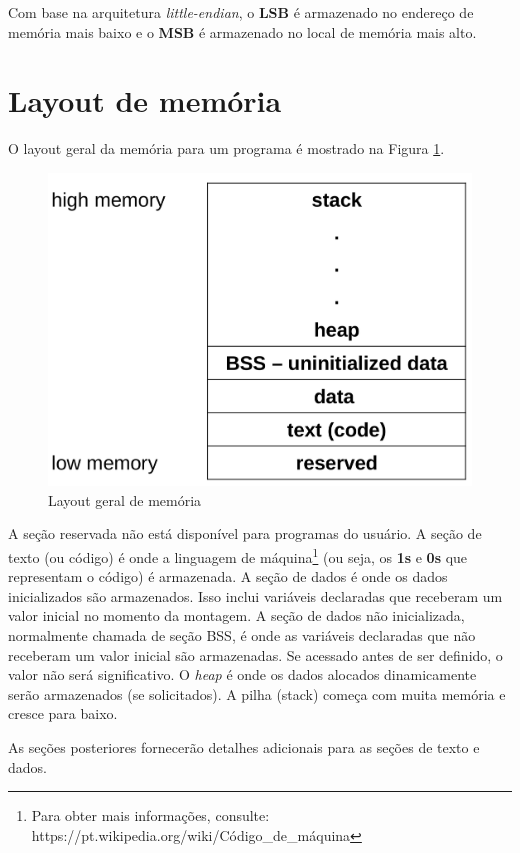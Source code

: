 Com base na arquitetura \textit{little-endian}, o \textbf{LSB} é armazenado no endereço de memória mais baixo e o \textbf{MSB} é armazenado no local de memória mais alto.

\section{Layout de memória}
O layout geral da memória para um programa é mostrado na Figura \ref{fig:memlayout}.
\begin{figure}[ht]
	\begin{center}
		\includegraphics[width=0.8\linewidth]{imagens/memlayout}
	\end{center}
	\caption{Layout geral de memória}
	\label{fig:memlayout}
\end{figure}

A seção reservada não está disponível para programas do usuário. A seção de texto (ou código) é onde a linguagem de máquina\footnote{Para obter mais informações, consulte: https://pt.wikipedia.org/wiki/Código\_de\_máquina} (ou seja, os \textbf{1s} e \textbf{0s} que representam o código) é armazenada. A seção de dados é onde os dados inicializados são armazenados. Isso inclui variáveis declaradas que receberam um valor inicial no momento da montagem. A seção de dados não inicializada, normalmente chamada de seção BSS, é onde as variáveis declaradas que não receberam um valor inicial são armazenadas. Se acessado antes de ser definido, o valor não será significativo. O \textit{heap} é onde os dados alocados dinamicamente serão armazenados (se solicitados). A pilha (stack) começa com muita memória e cresce para baixo.

As seções posteriores fornecerão detalhes adicionais para as seções de texto e dados.



